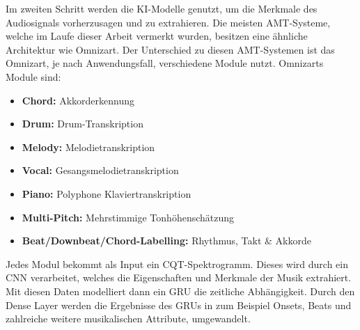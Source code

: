 Im zweiten Schritt werden die KI-Modelle genutzt, um die Merkmale des Audiosignals vorherzusagen und zu extrahieren.
Die meisten AMT-Systeme, welche im Laufe dieser Arbeit vermerkt wurden, besitzen eine ähnliche Architektur wie Omnizart.
\cite{hawthorne2017onsets}
Der Unterschied zu diesen AMT-Systemen ist das Omnizart, je nach Anwendungsfall, verschiedene Module nutzt.
Omnizarts Module sind:
\begin{itemize}
    \item \textbf{Chord:} Akkorderkennung
    \item \textbf{Drum:} Drum-Transkription
    \item \textbf{Melody:} Melodietranskription
    \item \textbf{Vocal:} Gesangsmelodietranskription
    \item \textbf{Piano:} Polyphone Klaviertranskription
    \item \textbf{Multi-Pitch:} Mehrstimmige Tonhöhenschätzung
    \item \textbf{Beat/Downbeat/Chord-Labelling:} Rhythmus, Takt \& Akkorde
\end{itemize}
Jedes Modul bekommt als Input ein CQT-Spektrogramm.
Dieses wird durch ein CNN verarbeitet, welches die Eigenschaften und Merkmale der Musik extrahiert.
Mit diesen Daten modelliert dann ein GRU die zeitliche Abhängigkeit.
Durch den Dense Layer werden die Ergebnisse des GRUs in zum Beispiel Onsets,
Beats und zahlreiche weitere musikalischen Attribute, umgewandelt.

